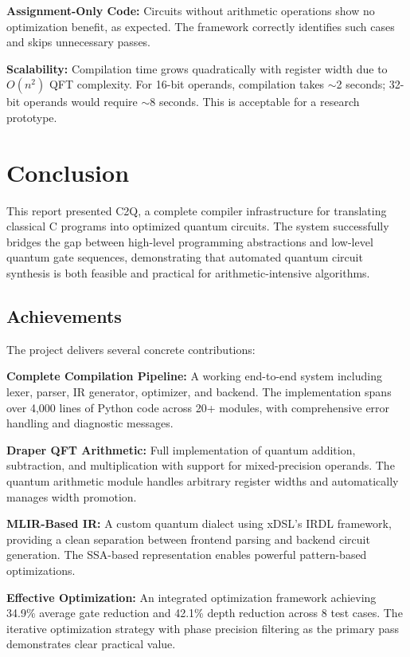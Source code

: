 \documentclass[a4paper,twocolumn]{article}
\begin{document}
\textbf{Assignment-Only Code:} Circuits without arithmetic operations show no optimization benefit, as expected.
The framework correctly identifies such cases and skips unnecessary passes.

\textbf{Scalability:} Compilation time grows quadratically with register width due to $O(n^2)$
QFT complexity. For 16-bit operands, compilation takes $\sim$2 seconds; 32-bit operands would
require $\sim$8 seconds. This is acceptable for a research prototype.

\section{Conclusion}

This report presented C2Q, a complete compiler infrastructure for translating classical C programs
into optimized quantum circuits. The system successfully bridges the gap between high-level programming
abstractions and low-level quantum gate sequences, demonstrating that automated quantum circuit
synthesis is both feasible and practical for arithmetic-intensive algorithms.

\subsection{Achievements}

The project delivers several concrete contributions:

\textbf{Complete Compilation Pipeline:} A working end-to-end system including lexer, parser, IR generator,
optimizer, and backend. The implementation spans over 4,000 lines of Python code across 20+ modules,
with comprehensive error handling and diagnostic messages.

\textbf{Draper QFT Arithmetic:} Full implementation of quantum addition, subtraction,
and multiplication with support for mixed-precision operands. The quantum arithmetic module
handles arbitrary register widths and automatically manages width promotion.

\textbf{MLIR-Based IR:} A custom quantum dialect using xDSL's IRDL framework, providing a clean
separation between frontend parsing and backend circuit generation. The SSA-based representation enables
powerful pattern-based optimizations.

\textbf{Effective Optimization:} An integrated optimization framework achieving 34.9\% average gate
reduction and 42.1\% depth reduction across 8 test cases. The iterative optimization strategy with phase
precision filtering as the primary pass demonstrates clear practical value.
\end{document}
